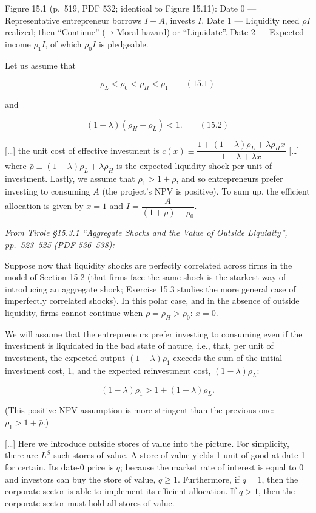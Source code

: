 \documentclass[11pt,a4paper]{article}
\begin{document}
Figure 15.1 (p.~519, PDF 532; identical to Figure 15.11): Date 0 --- Representative entrepreneur
borrows \(I - A\), invests \(I\). Date 1 --- Liquidity need \(\rho I\) realized; then ``Continue''
(→ Moral hazard) or ``Liquidate''. Date 2 --- Expected income \(\rho_1 I\), of which \(\rho_0 I\) is
pledgeable.

Let us assume that

\[\rho_L < \rho_0 < \rho_H < \rho_1 \qquad (15.1)\]

and

\[(1 - \lambda)(\rho_H - \rho_L) < 1. \qquad (15.2)\]

{[}\ldots{]} the unit cost of effective investment is
\(c(x) \equiv \dfrac{1 + (1 - \lambda)\rho_L + \lambda\rho_H x}{1 - \lambda + \lambda x}\)
{[}\ldots{]} where \(\bar\rho \equiv (1 - \lambda)\rho_L + \lambda\rho_H\) is the expected liquidity
shock per unit of investment. Lastly, we assume that \(\rho_1 > 1 + \bar\rho\), and so entrepreneurs
prefer investing to consuming \(A\) (the project's NPV is positive). To sum up, the efficient
allocation is given by \(x = 1\) and \(I = \dfrac{A}{(1 + \bar\rho) - \rho_0}\).

\emph{From Tirole §15.3.1 ``Aggregate Shocks and the Value of Outside Liquidity'', pp.~523--525 (PDF
536--538):}

Suppose now that liquidity shocks are perfectly correlated across firms in the model of Section 15.2
(that firms face the same shock is the starkest way of introducing an aggregate shock; Exercise 15.3
studies the more general case of imperfectly correlated shocks). In this polar case, and in the
absence of outside liquidity, firms cannot continue when \(\rho = \rho_H > \rho_0\): \(x = 0\).

We will assume that the entrepreneurs prefer investing to consuming even if the investment is
liquidated in the bad state of nature, i.e., that, per unit of investment, the expected output
\((1 - \lambda)\rho_1\) exceeds the sum of the initial investment cost, 1, and the expected
reinvestment cost, \((1 - \lambda)\rho_L\):

\[(1 - \lambda)\rho_1 > 1 + (1 - \lambda)\rho_L.\]

(This positive-NPV assumption is more stringent than the previous one: \(\rho_1 > 1 + \bar\rho\).)

{[}\ldots{]} Here we introduce outside stores of value into the picture. For simplicity, there are
\(L^S\) such stores of value. A store of value yields 1 unit of good at date 1 for certain. Its
date-0 price is \(q\); because the market rate of interest is equal to 0 and investors can buy the
store of value, \(q \geqslant 1\). Furthermore, if \(q = 1\), then the corporate sector is able to
implement its efficient allocation. If \(q > 1\), then the corporate sector must hold all stores of
value.
\end{document}
